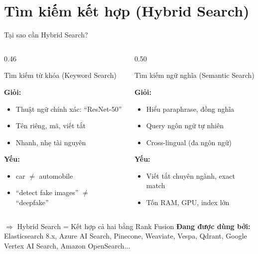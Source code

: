 \documentclass[aspectratio=169, 11pt]{beamer}
\begin{document}
\section{Tìm kiếm kết hợp (Hybrid Search)}

\begin{frame}{Tại sao cần Hybrid Search?}
\begin{columns}[T]
\begin{column}{0.46\textwidth}

\begin{block}{\textcolor{accentBlue}{Tìm kiếm từ khóa (Keyword Search)}}
{\small
\textbf{Giỏi:}
\begin{itemize}
    \item Thuật ngữ chính xác: ``ResNet-50''
    \item Tên riêng, mã, viết tắt
    \item Nhanh, nhẹ tài nguyên
\end{itemize}
\textbf{Yếu:}
\begin{itemize}
    \item car $\neq$ automobile
    \item ``detect fake images'' $\neq$ ``deepfake''
\end{itemize}
}
\end{block}

\end{column}
\begin{column}{0.50\textwidth}

\begin{block}{\textcolor{accentOrange}{Tìm kiếm ngữ nghĩa (Semantic Search)}}
{\small
\textbf{Giỏi:}
\begin{itemize}
    \item Hiểu paraphrase, đồng nghĩa
    \item Query ngôn ngữ tự nhiên
    \item Cross-lingual (đa ngôn ngữ)
\end{itemize}
\textbf{Yếu:}
\begin{itemize}
    \item Viết tắt chuyên ngành, exact match
    \item Tốn RAM, GPU, index lớn
\end{itemize}
}
\end{block}

\end{column}
\end{columns}

\vspace{0.3cm}

\begin{exampleblock}{$\Rightarrow$ Hybrid Search = Kết hợp cả hai bằng Rank Fusion}
{\small \textbf{Đang được dùng bởi:} Elasticsearch 8.x, Azure AI Search, Pinecone, Weaviate, Vespa, Qdrant, Google Vertex AI Search, Amazon OpenSearch...}
\end{exampleblock}
\end{frame}
\end{document}
